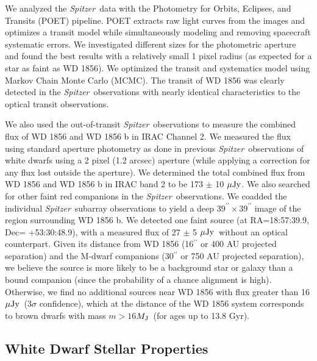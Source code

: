 \documentclass{nature3}
\newcommand{\mjup}{\ensuremath{M_{\rm J}}}
\newcommand{\microjanskys}{\ensuremath{\mathbf{{\rm \mu Jy}}}}
\newcommand{\project}[1]{\textsl{#1}}
\newcommand{\Spitzer}{\project{Spitzer}}
\begin{document}
\begin{methods}
We analyzed the \Spitzer\ data with the Photometry for Orbits, Eclipses, and Transits (POET) pipeline\cite{cubrillos}. POET extracts raw light curves from the images and optimizes a transit model while simultaneously modeling and removing spacecraft systematic errors. We investigated different sizes for the photometric aperture and found the best results with a relatively small 1 pixel radius (as expected for a star as faint as WD 1856). We optimized the transit and systematics model using Markov Chain Monte Carlo (MCMC). The transit of WD 1856 was clearly detected in the \Spitzer\ observations with nearly identical characteristics to the optical transit observations. 

We also used the out-of-transit \Spitzer\ observations to measure the combined flux of WD 1856 and WD 1856 b in IRAC Channel 2.  We measured the flux using standard aperture photometry as done in previous \Spitzer\ observations of white dwarfs\cite{xu2011, xu2018} using a 2 pixel (1.2 arcsec) aperture (while applying a correction for any flux lost outside the aperture). We determined the total combined flux from WD 1856 and WD 1856 b in IRAC band 2 to be 173 $\pm$ 10 \microjanskys. We also searched for other faint red companions in the \Spitzer\ observations. We coadded the individual \Spitzer\ subarray observations to yield a deep $39^{\prime\prime}\times39^{\prime\prime}$ image of the region surrounding WD 1856 b.  We detected one faint source (at RA=18:57:39.9, Dec= +53:30:48.9), with a measured flux of 27 $\pm$ 5 \microjanskys\ without an optical counterpart. Given its distance from WD 1856 (16$^{\prime\prime}$ or 400 AU projected separation) and the M-dwarf companions (30$^{\prime\prime}$ or 750 AU projected separation), we believe the source is more likely to be a background star or galaxy than a bound companion (since the probability of a chance alignment is high). Otherwise, we find no additional sources near WD 1856 with flux greater than 16 \microjanskys\ (3$\sigma$ confidence), which at the distance of the WD 1856 system corresponds to brown dwarfs with mass $m> 16$\mjup\ (for ages up to 13.8 Gyr). 



\subsection{White Dwarf Stellar Properties}


\end{methods}
\end{document}
